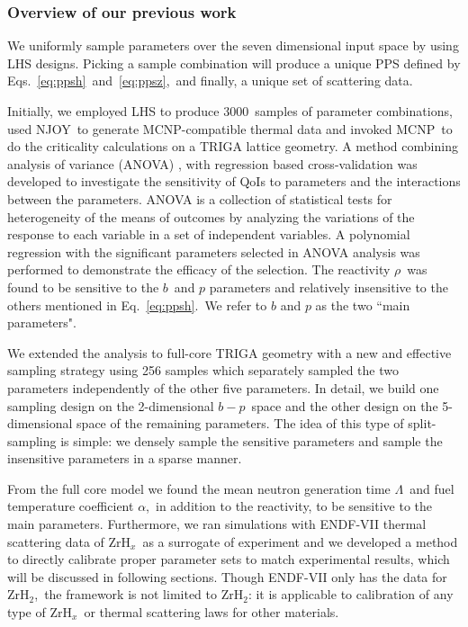 \documentclass[review]{elsarticle}
\newcommand{\zh}{ZrH$_x$}
\newcommand{\tcb}[1]{{#1}}
\begin{document}

\subsubsection*{Overview of our previous work}
We uniformly sample parameters over the seven dimensional input space by using LHS designs. Picking a sample combination will produce a unique PPS defined by Eqs.~\eqref{eq:ppsh}~and~\eqref{eq:ppsz},~and finally, a unique set of scattering data.

Initially, we employed LHS to produce $3000$~samples of parameter combinations, used NJOY\cite{NJOY}\ to generate MCNP-compatible thermal data and invoked MCNP\cite{mcnp}\ to do the criticality calculations on a TRIGA lattice geometry\cite{weixiong,thesis}. A method combining \tcb{analysis of variance (ANOVA) }, with regression based cross-validation was developed to investigate the sensitivity of QoIs to parameters and the interactions between the parameters. \tcb{ANOVA is a collection of statistical tests for heterogeneity of the means of  outcomes by analyzing the variations of the response to each variable in a set of independent variables\cite{mathematica,msa,santner2003design}. A polynomial regression with the significant parameters selected in ANOVA analysis was performed to demonstrate the efficacy of the selection\cite{santner2003design}}. The reactivity $\rho$~was  found to be sensitive to the $b$~and $p$ parameters and  relatively insensitive to the others mentioned in Eq.~\eqref{eq:ppsh}.~We refer to $b$ and $p$ as the two ``main parameters".

We extended the analysis to full-core TRIGA geometry with a new and effective sampling strategy using \tcb{256 samples} which separately sampled the two parameters independently of the other five parameters\cite{physor}. {In detail, we build one sampling design on the 2-dimensional $b-p$\ space and the other design on the 5-dimensional space of the remaining parameters. The idea of this type of split-sampling is simple: we densely sample the sensitive parameters and sample the insensitive parameters in a sparse manner.}

From the full core model we found the mean neutron generation time $\Lambda$~and fuel temperature coefficient $\alpha$,~in addition to the reactivity, to be sensitive to the \tcb{main} parameters. Furthermore, we ran simulations with ENDF-VII thermal scattering data of \zh~as a surrogate of experiment and we developed a method to directly calibrate proper parameter sets to match experimental results, which will be discussed in following sections. {Though ENDF-VII only has the data for ZrH$_2$\cite{NJOY,Macf},\ the framework is not limited to ZrH$_2$: it is applicable to calibration of any type of \zh\ or thermal scattering laws for other materials.}
\end{document}
